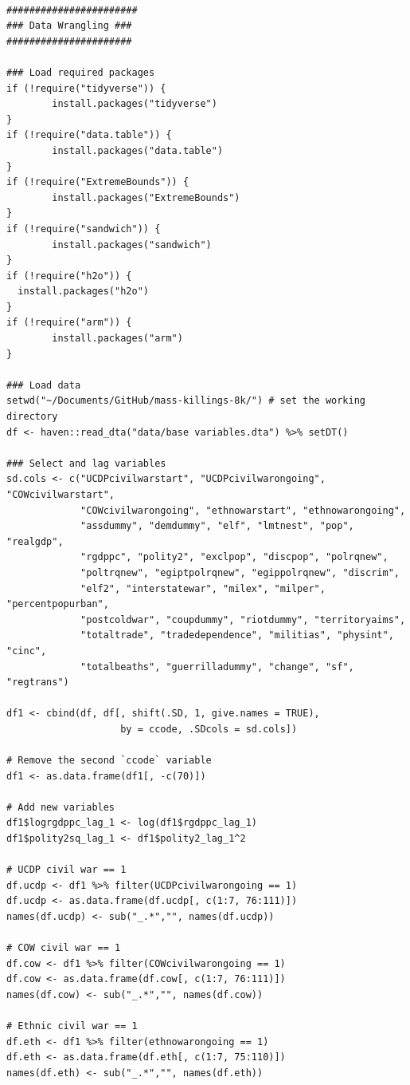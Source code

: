 \singlespacing
\small
\begin{verbatim}

#######################
### Data Wrangling ###
######################

### Load required packages
if (!require("tidyverse")) {
        install.packages("tidyverse")
}
if (!require("data.table")) {
        install.packages("data.table")
}
if (!require("ExtremeBounds")) {
        install.packages("ExtremeBounds")
}
if (!require("sandwich")) {
        install.packages("sandwich")
}
if (!require("h2o")) {
  install.packages("h2o")
}
if (!require("arm")) {
        install.packages("arm")
}

### Load data
setwd("~/Documents/GitHub/mass-killings-8k/") # set the working directory
df <- haven::read_dta("data/base variables.dta") %>% setDT()

### Select and lag variables
sd.cols <- c("UCDPcivilwarstart", "UCDPcivilwarongoing", "COWcivilwarstart",
             "COWcivilwarongoing", "ethnowarstart", "ethnowarongoing",
             "assdummy", "demdummy", "elf", "lmtnest", "pop", "realgdp",
             "rgdppc", "polity2", "exclpop", "discpop", "polrqnew",
             "poltrqnew", "egiptpolrqnew", "egippolrqnew", "discrim",
             "elf2", "interstatewar", "milex", "milper", "percentpopurban",
             "postcoldwar", "coupdummy", "riotdummy", "territoryaims",
             "totaltrade", "tradedependence", "militias", "physint", "cinc",
             "totalbeaths", "guerrilladummy", "change", "sf", "regtrans")

df1 <- cbind(df, df[, shift(.SD, 1, give.names = TRUE),
                    by = ccode, .SDcols = sd.cols]) 

# Remove the second `ccode` variable
df1 <- as.data.frame(df1[, -c(70)])

# Add new variables
df1$logrgdppc_lag_1 <- log(df1$rgdppc_lag_1)
df1$polity2sq_lag_1 <- df1$polity2_lag_1^2

# UCDP civil war == 1
df.ucdp <- df1 %>% filter(UCDPcivilwarongoing == 1)
df.ucdp <- as.data.frame(df.ucdp[, c(1:7, 76:111)])
names(df.ucdp) <- sub("_.*","", names(df.ucdp)) 

# COW civil war == 1
df.cow <- df1 %>% filter(COWcivilwarongoing == 1)
df.cow <- as.data.frame(df.cow[, c(1:7, 76:111)])
names(df.cow) <- sub("_.*","", names(df.cow)) 

# Ethnic civil war == 1
df.eth <- df1 %>% filter(ethnowarongoing == 1)
df.eth <- as.data.frame(df.eth[, c(1:7, 75:110)])
names(df.eth) <- sub("_.*","", names(df.eth)) 


\end{verbatim}
